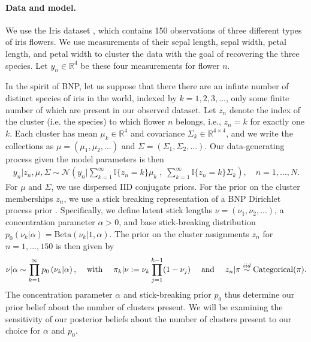\paragraph{Data and model.}
We use the Iris dataset \citep{iris_data_anderson, iris_data_fisher}, which
contains 150 observations of three different types of iris flowers. We use
measurements of their sepal length, sepal width, petal length, and petal width
to cluster the data with the goal of recovering the three species. Let $y_{n}\in
\mathbb{R}^4$ be these four measurements for flower $n$.

In the spirit of BNP, let us suppose that there there are an infinte number of
distinct species of iris in the world, indexed by $k=1,2,3,\ldots$, only some
finite number of which are present in our observed dataset.  Let $z_n$ denote
the index of the cluster (i.e. the species) to which flower $n$ belongs, i.e.,
$z_n = k$ for exactly one $k$. Each cluster has mean $\mu_k\in
\mathbb{R}^4$ and covariance $\Sigma_k \in \mathbb{R}^{4\times 4}$, and we write
the collections as $\mu = \left(\mu_1, \mu_2, ...\right)$ and $\Sigma =
\left(\Sigma_1, \Sigma_2, ... \right)$. Our data-generating process given the
model parameters is then
%
\begin{align*}
	y_n | z_n, \mu, \Sigma \sim
        \mathcal{N}\left(
            y_n \Big\vert
                \sum_{k=1}^\infty \mathbb{I}\{z_n = k\} \mu_k \;,
              \; \sum_{k=1}^\infty \mathbb{I}\{z_n = k\} \Sigma_k\right),
	\quad n = 1, ..., N.
\end{align*}
%
For $\mu$ and $\Sigma$, we use dispersed IID conjugate priors. For the prior on
the cluster memberships $z_n$, we use a stick breaking representation of a BNP
Dirichlet process prior \citep{mccloskey:1965:model, ferguson:1973:bayesian,
patil:1977:diversity, sethuraman:1994:constructivedp}. Specifically, we define
latent stick lengths $\nu=\left(\nu_1, \nu_2, ...\right)$, a concentration
parameter $\alpha>0$, and base stick-breaking distribution $p_{0}\left(\nu_k
\vert \alpha \right) = \mathrm{Beta}\left(\nu_k \Big\vert 1, \alpha \right)$.
The prior on the cluster assignments $z_n$ for $n=1,...,150$ is then given by
%
\begin{align}
\nu \vert \alpha \sim \prod_{k=1}^\infty p_{0}\left(\nu_k \vert \alpha \right)
\textrm{,}
    \quad\textrm{ with }\quad
\pi_k | \nu := \nu_k \prod_{j=1}^{k-1} (1 - \nu_j)
\quad\textrm{ and }\quad
z_n \vert \pi \stackrel{iid}{\sim} \mathrm{Categorical}(\pi). \label{eq:stick_breaking}
\end{align}
%
The concentration parameter $\alpha$ and stick-breaking prior $p_{0}$
thus determine our prior belief about the number of clusters present.
We will be examining the sensitivity of our posterior beliefs about the
number of clusters present to our choice for $\alpha$ and $p_{0}$.
